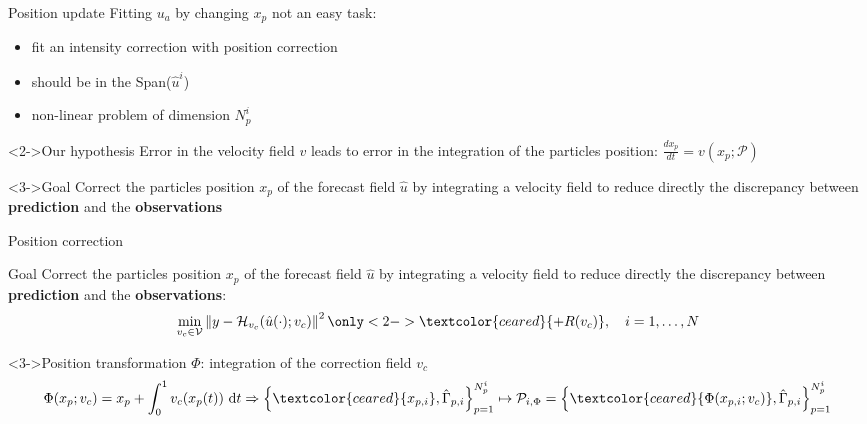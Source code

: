 \documentclass[aspectratio=169]{beamer} %
\begin{document}
\begin{frame}{Position update}
    Fitting $u_a$ by changing $x_p$ not an easy task:
    \begin{itemize}
        \item fit an intensity correction with position correction
        \item should be in the Span($\hat u^i$)
        \item non-linear problem of dimension $N_p^i$
    \end{itemize}

    \begin{block}<2->{Our hypothesis}
        Error in the velocity field $v$ leads to error in the integration of the particles position: $\frac{d x_p}{d t} = v(x_p; \mathcal P)$
    \end{block}

    \begin{block}<3->{Goal}
        Correct the particles position $x_p$ of the forecast field $\hat u$ by integrating a velocity field to reduce directly the discrepancy between \textbf{prediction} and the \textbf{observations}
    \end{block}
\end{frame}

\begin{frame}{Position correction}
    \begin{block}{Goal}
        Correct the particles position $x_p$ of the forecast field $\hat u$ by integrating a velocity field to reduce directly the discrepancy between \textbf{prediction} and the \textbf{observations}:
        \begin{equation*}
            \min_{v_c \in \mathcal V} \left\|y - \mathcal H_{v_c}(\hat u(\cdot); v_c) \right\|^2 \only<2->{\textcolor{ceared}{+ R(v_c)}}, \quad i = 1, \dots, N
        \end{equation*}
    \end{block}

    \begin{block}<3->{Position transformation $\Phi$: integration of the correction field $v_c$}
        \begin{equation*}
            \Phi(x_p; v_c) = x_p + \int_{0}^{1} v_c(x_p(t))~\mathrm{d}t \Rightarrow \left\{\textcolor{ceared}{x_{p,i}}, \hat \Gamma_{p,i}\right\}_{p=1}^{N^i_p} \mapsto \mathcal{P}_{i, \Phi} = \left\{\textcolor{ceared}{\Phi(x_{p,i}; v_c)}, \hat \Gamma_{p,i}\right\}_{p=1}^{N^i_p}
        \end{equation*}
    \end{block}
\end{frame}
\end{document}

